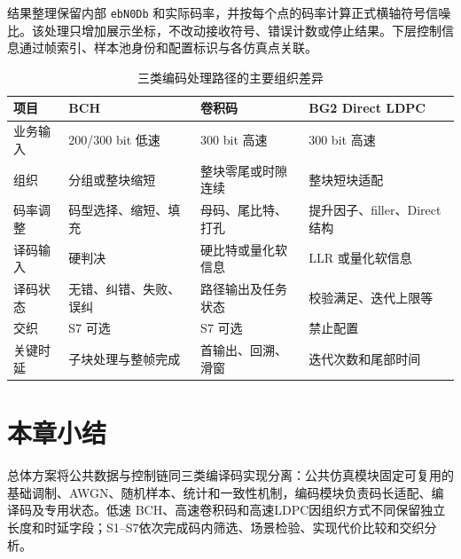 结果整理保留内部 \texttt{ebN0Db} 和实际码率，并按每个点的码率计算正式横轴符号信噪比。该处理只增加展示坐标，不改动接收符号、错误计数或停止结果。下层控制信息通过帧索引、样本池身份和配置标识与各仿真点关联。

\begin{table}[htbp]
  \centering
  \small
  \caption{三类编码处理路径的主要组织差异}
  \label{tab:codec-path-comparison}
  \begin{tabular}{p{}p{}p{}p{}}
    \toprule
    项目 & BCH & 卷积码 & BG2 Direct LDPC \\
    \midrule
    业务输入 & 200/300 bit 低速 & 300 bit 高速 & 300 bit 高速 \\
    组织 & 分组或整块缩短 & 整块零尾或时隙连续 & 整块短块适配 \\
    码率调整 & 码型选择、缩短、填充 & 母码、尾比特、打孔 & 提升因子、filler、Direct 结构 \\
    译码输入 & 硬判决 & 硬比特或量化软信息 & LLR 或量化软信息 \\
    译码状态 & 无错、纠错、失败、误纠 & 路径输出及任务状态 & 校验满足、迭代上限等 \\
    交织 & S7 可选 & S7 可选 & 禁止配置 \\
    关键时延 & 子块处理与整帧完成 & 首输出、回溯、滑窗 & 迭代次数和尾部时间 \\
    \bottomrule
  \end{tabular}
\end{table}

\section{本章小结}

总体方案将公共数据与控制链同三类编译码实现分离：公共仿真模块固定可复用的基础调制、AWGN、随机样本、统计和一致性机制，编码模块负责码长适配、编译码及专用状态。低速 BCH、高速卷积码和高速LDPC因组织方式不同保留独立长度和时延字段；S1--S7依次完成码内筛选、场景检验、实现代价比较和交织分析。

